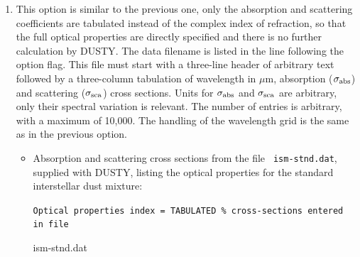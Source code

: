\documentclass[11pt]{article}
\def\D  {{\sf DUSTY}}
\def\mic    {\hbox{$\mu$m}}
\begin{document}
\begin{enumerate}
\begin{itemize}
\item Draine \& Lee graphite grains with three additional grain types
    whose {\tt n} and {\tt k} are provided by the user in data files
    {\tt amC-zb1.nk}, {\tt amC-zb2.nk} and {\tt amC-zb3.nk},
    distributed with DUSTY.  These files tabulate the most recent
    properties for amorphous carbon by Zubko et al \cite{Zubko}:

\begin{verbatim}
   Optical properties index = COMMON_AND_ADDL_GRAIN
   Abundances of built-in grain types:
         Sil-Ow  Sil-Oc  Sil-DL  grf-DL amC-Hn SiC-Pg
     x =  0.00    0.00    0.00    0.22   0.00  0.00

   Number of additional components = 3, properties listed in files
                     amC-zb1.nk
                     amC-zb2.nk
                     amC-zb3.nk
   Abundances for these components = 0.45, 0.10, 0.23
\end{verbatim}
\end{itemize}

\item This option is similar to the previous one, only the absorption and
    scattering coefficients are tabulated instead of the complex index of
    refraction, so that the full optical properties are directly specified
    and there is no further calculation by \D.  The data filename is listed
    in the line following the option flag.  This file must start with a
    three-line header of arbitrary text followed by a three-column
    tabulation of wavelength in \mic, absorption ($\sigma_{\rm abs}$) and
    scattering ($\sigma_{\rm sca}$) cross sections. Units for $\sigma_{\rm
    abs}$ and $\sigma_{\rm sca}$ are arbitrary, only their spectral
    variation is relevant. The number of entries is arbitrary, with a
    maximum of 10,000. The handling of the wavelength grid is the same as
    in the previous option.

\begin{itemize}
\item Absorption and scattering cross sections from the file {\tt
    ism-stnd.dat}, supplied with \D, listing the optical properties for
    the standard interstellar dust mixture:

{\tt Optical properties index = TABULATED \% cross-sections entered in
file

\hskip 0.5in        ism-stnd.dat}
\end{itemize}

\end{enumerate}
\end{document}
